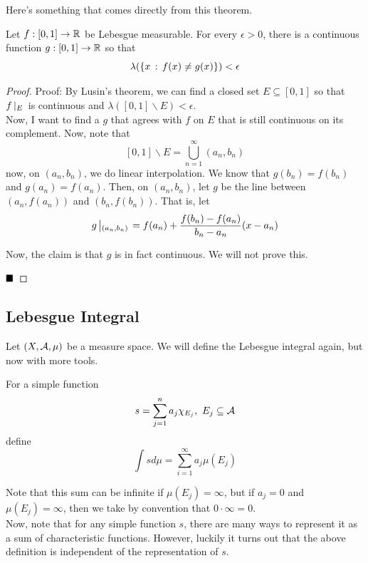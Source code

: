 Here's something that comes directly from this theorem.

\begin{lemma}
    Let $f : [0, 1] \to \R$ be Lebesgue measurable. For every $\epsilon > 0$, there is a continuous function $g : [0, 1] \to \R$ so that
    \[ \lambda(\{x \col f(x) \ne g(x)\}) < \epsilon \]
\end{lemma}
\begin{proof}{Proof:}
    By Lusin's theorem, we can find a closed set $E \subseteq [0, 1]$ so that $f\res{E}$ is continuous and $\lambda([0, 1] \backslash E) < \epsilon$.\\

    Now, I want to find a $g$ that agrees with $f$ on $E$ that is still continuous on its complement. Now, note that
    \[ [0, 1] \backslash E = \bigcup_{n = 1}^{\infty} (a_n, b_n) \]
    now, on $(a_n, b_n)$, we do linear interpolation. We know that $g(b_n) = f(b_n)$ and $g(a_n) = f(a_n)$. Then, on $(a_n, b_n)$, let $g$ be the line between $(a_n, f(a_n))$ and $(b_n, f(b_n))$. That is, let
    \[ g\res{(a_n, b_n)} = f(a_n) + \frac{f(b_n) - f(a_n)}{b_n - a_n}(x - a_n) \]

    Now, the claim is that $g$ is in fact continuous. We will not prove this.

    $\qed$
\end{proof}

\subsection*{Lebesgue Integral}
\sectionspace

Let $(X, \cal{A}, \mu)$ be a measure space. We will define the Lebesgue integral again, but now with more tools. 

\begin{definition}
    For a simple function
    \[ s = \sum_{j = 1}^{n} a_j\chi_{E_j},\ E_j \subseteq \cal{A} \]
    define
    \[ \int s d\mu = \sum_{i = 1}^{\infty} a_j\mu(E_j) \]
\end{definition}

Note that this sum can be infinite if $\mu(E_j) = \infty$, but if $a_j = 0$ and $\mu(E_j) = \infty$, then we take by convention that $0 \cdot \infty = 0$.\\

Now, note that for any simple function $s$, there are many ways to represent it as a sum of characteristic functions. However, luckily it turns out that the above definition is independent of the representation of $s$.\\

